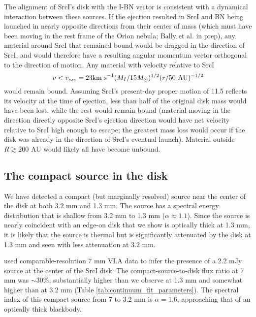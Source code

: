 \documentclass[twocolumn]{aastex61}
\newcommand{\sourcei}{SrcI\xspace}
\begin{document}
The alignment of \sourcei's disk with the I-BN vector is consistent with a
dynamical interaction between these sources.  If the ejection resulted in
\sourcei and BN being launched in nearly opposite directions from their center
of mass (which must have been moving in the rest frame of the Orion nebula; 
Bally et al. in prep), any material around \sourcei that remained bound would
be dragged in the direction of \sourcei, and would therefore have a resulting
angular momentum vector orthogonal to the direction of motion.  Any material
with
velocity relative to \sourcei 
$$v < v_{esc} = 23 \textrm{km~s}^{-1} (M_I/15M_{\odot})^{1/2}  (r/50~\mathrm{AU})^{-1/2}$$
would remain bound.
Assuming \sourcei's present-day proper motion of 11.5 \kms reflects its velocity
at the time of ejection, less than half of the original disk mass would
have been lost, while the rest would remain bound (material moving in the
direction directly opposite \sourcei's ejection direction would have net
velocity relative to \sourcei high enough to escape; the greatest mass
loss would occur if the disk was already in the direction of \sourcei's eventual
launch).
Material outside $R\gtrsim200$ AU would likely all have become unbound.


\subsection{The compact source in the disk}
\label{sec:ptsrc}
We have detected a compact (but marginally resolved) source near the center of
the disk at both 3.2 mm and 1.3 mm.  The source has a spectral energy distribution
that is shallow from 3.2 mm to 1.3 mm ($\alpha\approx1.1$).  Since the source is nearly
coincident with an edge-on disk that we show is optically thick at 1.3 mm, it is
likely that the source is thermal but is significantly attenuated by the disk
at 1.3 mm and seen with less attenuation at 3.2 mm.

\citet{Reid2007a} used comparable-resolution 7 mm VLA data to infer
the presence of a 2.2 mJy source at the center of the \sourcei disk.
The compact-source-to-disk flux ratio at 7 mm was $\sim30\%$, substantially
higher than we observe at 1.3 mm and somewhat
higher than at 3.2 mm (Table \ref{tab:continuum_fit_parameters}).  
The spectral index of this compact source from 7 to 3.2 mm is $\alpha=1.6$,
approaching that of an optically
thick blackbody.
\end{document}
